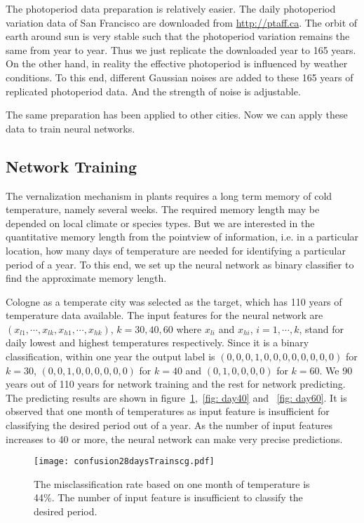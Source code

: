 \documentclass[paper=a4, fontsize=12pt]{scrartcl}	%
\numberwithin{equation}{section}					%
\numberwithin{figure}{section}					%
\numberwithin{table}{section}					%
\begin{document}
The photoperiod data preparation is relatively easier. The daily photoperiod variation data of San Francisco are downloaded from \url{http://ptaff.ca}. The orbit of earth around sun is very stable such that the photoperiod variation remains the same from year to year. Thus we just replicate the downloaded year to 165 years. On the other hand, in reality the effective photoperiod is influenced by weather conditions. To this end, different Gaussian noises are added to these 165 years of replicated photoperiod data. And the strength of noise is adjustable. 

The same preparation has been applied to other cities. Now we can apply these data to train neural networks. 

\subsection{Network Training}
The vernalization mechanism in plants requires a long term memory of cold temperature, namely several weeks. The required memory length may be depended on local climate or species types. But we are interested in the quantitative memory length from the pointview of information, i.e. in a particular location, how many days of temperature are needed for identifying a particular period of a year. To this end, we set up the neural network as binary classifier to find the approximate memory length. 

Cologne as a temperate city was selected as the target, which has 110 years of temperature data available. The input features for the neural network are $(x_{l1}, \cdots, x_{lk}, x_{h1},\cdots, x_{hk})$, $k=30, 40, 60$ where $x_{li}$ and $x_{hi}$, $i=1,\cdots, k$, stand for daily lowest and highest temperatures respectively. Since it is a binary classification, within one year the output label is $(0, 0, 0, 1, 0, 0, 0, 0, 0, 0, 0, 0)$ for $k=30$, $(0, 0, 1, 0, 0, 0, 0, 0, 0)$ for $k=40$ and $(0, 1, 0, 0, 0, 0)$ for $k=60$. We 90 years out of 110 years for network training and the rest for network predicting. The predicting results are shown in figure~\ref{fig: day30},~\ref{fig: day40} and ~\ref{fig: day60}. It is observed that one month of temperatures as input feature is insufficient for classifying the desired period out of a year. As the number of input features increases to 40 or more, the neural network can make very precise predictions. 

\begin{figure}[H]
\centering
\texttt{[image: confusion28daysTrainscg.pdf]}
\caption{The misclassification rate based on one month of temperature is 44\%. The number of input feature is insufficient to classify the desired period.}
\label{fig: day30}
\end{figure}
\end{document}
